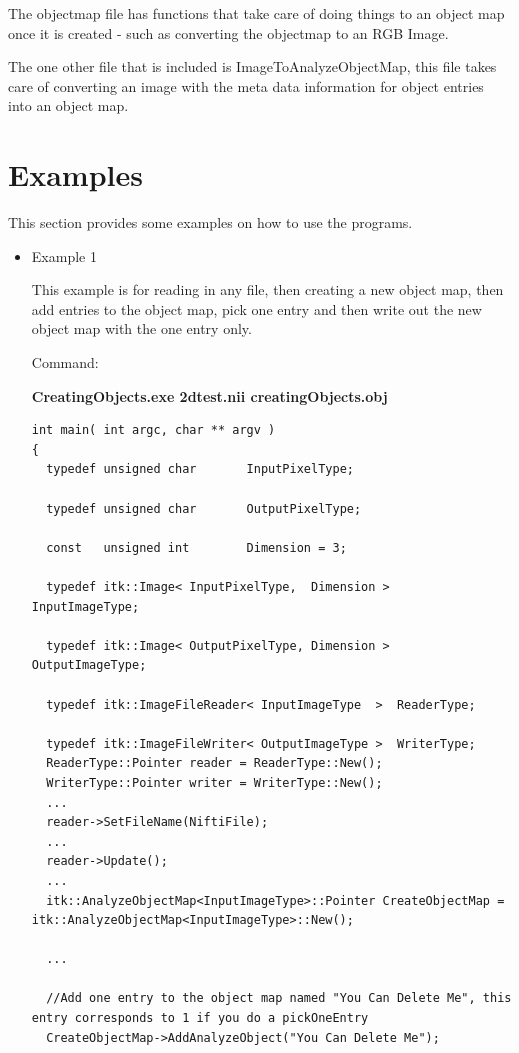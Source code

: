 \documentclass{InsightArticle}
\begin{document}
The objectmap file has functions that take care of doing things to an object map once it is created - such as converting the objectmap to an RGB Image. 

The one other file that is included is ImageToAnalyzeObjectMap, this file takes care of converting an image with the meta data information for object entries into an object map.

\section{Examples}

This section provides some examples on how to use the programs.
\begin{itemize}
\item Example 1 

This example is for reading in any file, then creating a new object map, then add entries to the object map, pick one entry and then write out the new object map with the one entry only.


Command:

\textbf{CreatingObjects.exe 2dtest.nii creatingObjects.obj}\\


\small \begin{verbatim}
int main( int argc, char ** argv )
{
  typedef unsigned char       InputPixelType;
  
  typedef unsigned char       OutputPixelType;
  
  const   unsigned int        Dimension = 3;
  
  typedef itk::Image< InputPixelType,  Dimension >    InputImageType;
  
  typedef itk::Image< OutputPixelType, Dimension >    OutputImageType;
  
  typedef itk::ImageFileReader< InputImageType  >  ReaderType;
  
  typedef itk::ImageFileWriter< OutputImageType >  WriterType;
  ReaderType::Pointer reader = ReaderType::New();
  WriterType::Pointer writer = WriterType::New();
  ...
  reader->SetFileName(NiftiFile);
  ...
  reader->Update();
  ...
  itk::AnalyzeObjectMap<InputImageType>::Pointer CreateObjectMap = itk::AnalyzeObjectMap<InputImageType>::New();
  
  ...
  
  //Add one entry to the object map named "You Can Delete Me", this entry corresponds to 1 if you do a pickOneEntry
  CreateObjectMap->AddAnalyzeObject("You Can Delete Me");


\end{verbatim}
\end{itemize}
\end{document}
